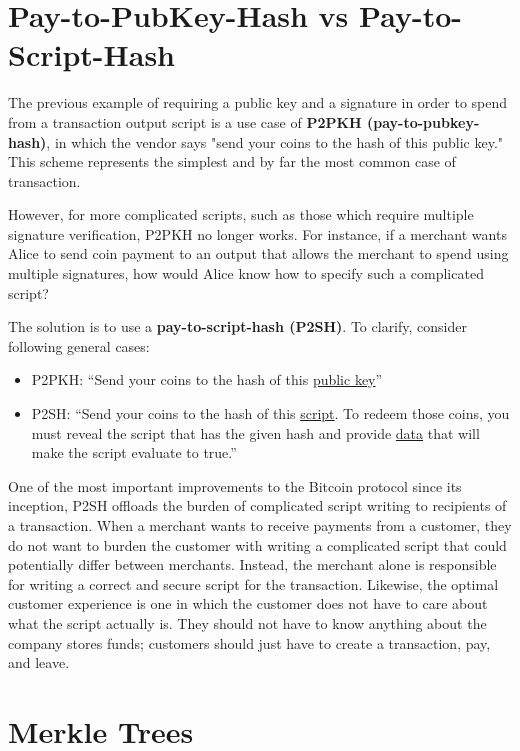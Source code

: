 \documentclass[full.tex]{subfiles}
\begin{document}
 \section*{Pay-to-PubKey-Hash vs Pay-to-Script-Hash}
 
 The previous example of requiring a public key and a signature in order to spend from a transaction output script is a use case of \textbf{P2PKH (pay-to-pubkey-hash)}, in which the vendor says "send your coins to the hash of this public key." This scheme represents the simplest and by far the most common case of transaction.
 
 However, for more complicated scripts, such as those which require multiple signature verification, P2PKH no longer works. For instance, if a merchant wants Alice to send coin payment to an output that allows the merchant to spend using multiple signatures, how would Alice know how to specify such a complicated script?
 
 The solution is to use a \textbf{pay-to-script-hash (P2SH)}. To clarify, consider following general cases:
 
 \begin{itemize}
     \item P2PKH: ``Send your coins to the hash of this \underline{public key}''
     \item P2SH: ``Send your coins to the hash of this \underline{script}. To redeem those coins, you must reveal the script that has the given hash and provide \underline{data} that will make the script evaluate to true.''
 \end{itemize}
 
 One of the most important improvements to the Bitcoin protocol since its inception, P2SH offloads the burden of complicated script writing to recipients of a transaction. When a merchant wants to receive payments from a customer, they do not want to burden the customer with writing a complicated script that could potentially differ between merchants. Instead, the merchant alone is responsible for writing a correct and secure script for the transaction. Likewise, the optimal customer experience is one in which the customer does not have to care about what the script actually is. They should not have to know anything about the company stores funds; customers should just have to create a transaction, pay, and leave.
 
 \section*{Merkle Trees}
 
\end{document}
